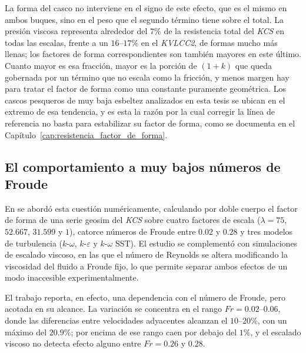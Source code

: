 La forma del casco no interviene en el signo de este efecto, que es el mismo en
ambos buques, sino en el peso que el segundo término tiene sobre el total. La
presión viscosa representa alrededor del $7\%$ de la resistencia total del
\textit{KCS} en todas las escalas, frente a un $16$--$17\%$ en el \textit{KVLCC2}, de
formas mucho más llenas; los factores de forma correspondientes son también
mayores en este último. Cuanto mayor es esa fracción, mayor es la porción de
$(1+k)$ que queda gobernada por un término que no escala como la fricción, y
menos margen hay para tratar el factor de forma como una constante puramente
geométrica. Los cascos pesqueros de muy baja esbeltez analizados en esta tesis se
ubican en el extremo de esa tendencia, y es esta la razón por la cual corregir la
línea de referencia no basta para estabilizar su factor de forma, como se
documenta en el Capítulo~\ref{cap:resistencia_factor_de_forma}.

\subsection{El comportamiento a muy bajos números de Froude}

En \citet{TERZIEV2021147} se abordó esta cuestión numéricamente, calculando por
doble cuerpo el factor de forma de una serie geosim del \textit{KCS} sobre cuatro
factores de escala ($\lambda = 75$, $52.667$, $31.599$ y $1$), catorce números de
Froude entre $0.02$ y $0.28$ y tres modelos de turbulencia ($k$-$\omega$,
$k$-$\varepsilon$ y $k$-$\omega$ SST). El estudio se complementó con simulaciones
de escalado viscoso, en las que el número de Reynolds se altera modificando la
viscosidad del fluido a Froude fijo, lo que permite separar ambos efectos de un
modo inaccesible experimentalmente.

El trabajo reporta, en efecto, una dependencia con el número de Froude, pero
acotada en su alcance. La variación se concentra en el rango $Fr = 0.02$--$0.06$,
donde las diferencias entre velocidades adyacentes alcanzan el $10$--$20\%$, con
un máximo del $20.9\%$; por encima de ese rango caen por debajo del $1\%$, y el
escalado viscoso no detecta efecto alguno entre $Fr = 0.26$ y $0.28$.

